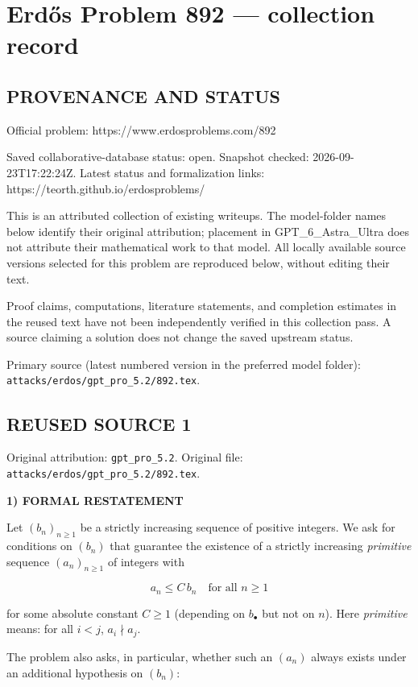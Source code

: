 \section*{Erd\H{o}s Problem 892 --- collection record}

\subsection*{PROVENANCE AND STATUS}
Official problem: https://www.erdosproblems.com/892

Saved collaborative-database status: open.
Snapshot checked: 2026-09-23T17:22:24Z.
Latest status and formalization links: https://teorth.github.io/erdosproblems/

This is an attributed collection of existing writeups. The model-folder names below identify their original attribution; placement in GPT\_6\_Astra\_Ultra does not attribute their mathematical work to that model. All locally available source versions selected for this problem are reproduced below, without editing their text.

Proof claims, computations, literature statements, and completion estimates in the reused text have not been independently verified in this collection pass. A source claiming a solution does not change the saved upstream status.

Primary source (latest numbered version in the preferred model folder): \texttt{attacks/erdos/gpt\_pro\_5.2/892.tex}.

\subsection*{REUSED SOURCE 1}
Original attribution: \texttt{gpt\_pro\_5.2}.
Original file: \texttt{attacks/erdos/gpt\_pro\_5.2/892.tex}.




\noindent\textbf{1) FORMAL RESTATEMENT}

Let $(b_n)_{n\ge 1}$ be a strictly increasing sequence of positive integers.
We ask for conditions on $(b_n)$ that guarantee the existence of a strictly
increasing \emph{primitive} sequence $(a_n)_{n\ge 1}$ of integers with

\[ a_n \le C\, b_n \quad \text{for all } n\ge 1 \]

for some absolute constant $C\ge 1$ (depending on $b_\bullet$ but not on $n$).
Here \emph{primitive} means: for all $i<j$, $a_i\nmid a_j$.

The problem also asks, in particular, whether such an $(a_n)$ always exists under
an additional hypothesis on $(b_n)$:

